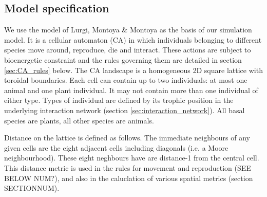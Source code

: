 \subsection{Model specification}
\label{sec:the_model}






We use the model of Lurgi, Montoya \& Montoya \cite{lurgi2015effects} as the basis of our simulation model. It is a cellular automaton (CA) in which individuals belonging to different species move around, reproduce, die and interact. These actions are subject to bioenergetic constraint and the rules governing them are detailed in section \ref{sec:CA_rules} below. The CA landscape is a homogeneous 2D square lattice with toroidal boundaries. Each cell can contain up to two individuals: at most one animal and one plant individual. It may not contain more than one individual of either type. Types of individual are defined by its trophic position in the underlying interaction network (section \ref{sec:interaction_network}). All basal species are plants, all other species are animals.

Distance on the lattice is defined as follows. The immediate neighbours of any given cells are the eight adjacent cells including diagonals (i.e. a Moore neighbourhood). These eight neghbours have are distance-1 from the central cell. This distance metric is used in the rules for movement and reproduction (SEE BELOW NUM?), and also in the caluclation of various spatial metrics (section SECTIONNUM).

